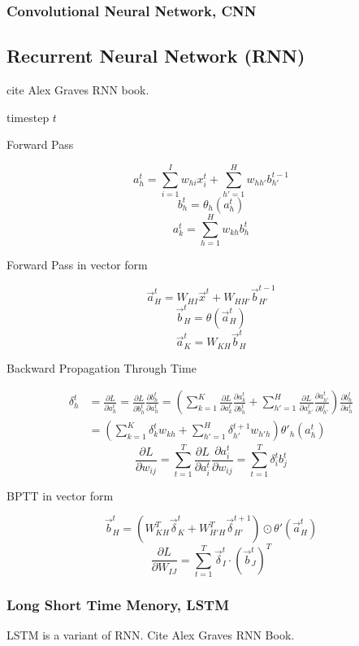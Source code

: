  \subsubsection{Convolutional Neural Network, CNN}

\subsection{Recurrent Neural Network (RNN)}

 cite Alex Graves RNN book.

 timestep $t$

 Forward Pass

 $$a_h^t = \sum_{i=1}^I w_{hi}x_i^t + \sum_{h'=1}^H w_{hh'} b_{h'}^{t-1}$$
 $$b_h^t = \theta_h (a_h^t)$$
 $$a_k^t = \sum_{h=1}^H w_{kh}b_h^t$$

 Forward Pass in vector form

 $$\vec{a}_H^t = W_{HI}\vec{x}^t + W_{HH'}\vec{b}_{H'}^{t-1}$$
 $$\vec{b}_H^t = \theta(\vec{a}_H^t)$$
 $$\vec{a}_K^t = W_{KH}\vec{b}_H^t$$

 Backward Propagation Through Time

 \begin{align*}
	 \delta_h^t &= \frac{\partial L}{\partial a_h^t} = \frac{\partial L}{\partial b_h^t}\frac{\partial b_h^t}{\partial a_h^t}
	= (\sum_{k=1}^K \frac{\partial L}{\partial a_k^t}\frac{\partial a_k^t}{\partial b_h^t}
	+ \sum_{h'=1}^H \frac{\partial L}{\partial a_{h'}^t}\frac{\partial a_{h'}^t}{\partial b_{h'}^t})
	  \frac{\partial b_h^t}{\partial a_h^t} \\
	 &= (\sum_{k=1}^K \delta_k^t w_{kh}
	+ \sum_{h'=1}^H \delta_{h'}^{t+1} w_{h'h}) \theta'_h(a_h^t)
 \end{align*}
 $$\frac{\partial L}{\partial w_{ij}}
   = \sum_{t=1}^T \frac{\partial L}{\partial a_i^t}
	 \frac{\partial a_i^t}{\partial w_{ij}}
   = \sum_{t=1}^T \delta_i^t b_j^t$$

 BPTT in vector form

 $$\vec{b}_H^t
   = (W_{KH}^T \vec{\delta}_K^t + W_{H'H}^T \vec{\delta}_{H'}^{t+1})
	 \odot \theta'(\vec{a}_H^t)$$
 $$\frac{\partial L}{\partial W_{IJ}}
   = \sum_{t=1}^T \vec{\delta}_I^t \cdot (\vec{b}_J^t)^T $$

 \subsubsection{Long Short Time Menory, LSTM}

 LSTM is a variant of RNN. Cite Alex Graves RNN Book.

